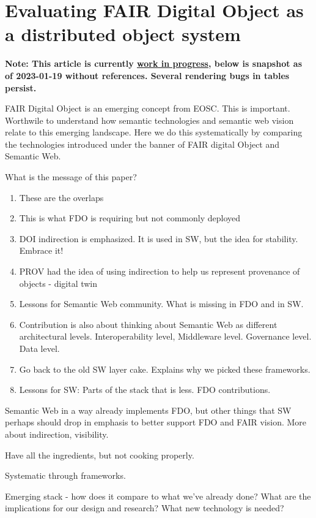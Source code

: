 \section{Evaluating FAIR Digital Object as a distributed object system}

\textbf{Note: This article is currently \href{https://stain.github.io/2022-fdo-paper/}{work in
progress}, below is snapshot as of 2023-01-19 without references. Several rendering bugs in tables persist.}


FAIR Digital Object is an emerging concept from EOSC. This is important.
Worthwile to understand how semantic technologies and semantic web
vision relate to this emerging landscape. Here we do this systematically
by comparing the technologies introduced under the banner of FAIR
digital Object and Semantic Web.

What is the message of this paper?

\begin{enumerate}
\def\labelenumi{\arabic{enumi}.}
\tightlist
\item
  These are the overlaps
\item
  This is what FDO is requiring but not commonly deployed
\item
  DOI indirection is emphasized. It is used in SW, but the idea for
  stability. Embrace it!
\item
  PROV had the idea of using indirection to help us represent provenance
  of objects - digital twin
\item
  Lessons for Semantic Web community. What is missing in FDO and in SW.
\item
  Contribution is also about thinking about Semantic Web as different
  architectural levels. Interoperability level, Middleware level.
  Governance level. Data level.
\item
  Go back to the old SW layer cake. Explains why we picked these
  frameworks.
\item
  Lessons for SW: Parts of the stack that is less. FDO contributions.
\end{enumerate}

Semantic Web in a way already implements FDO, but other things that SW
perhaps should drop in emphasis to better support FDO and FAIR vision.
More about indirection, visibility.

Have all the ingredients, but not cooking properly.

Systematic through frameworks.

Emerging stack - how does it compare to what we've already done? What
are the implications for our design and research? What new technology is
needed?

